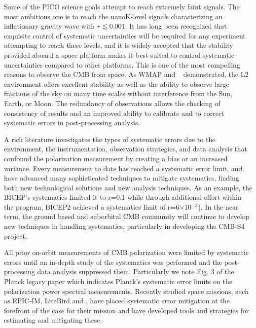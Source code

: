 \documentclass[PICOReport.tex]{subfiles}
\begin{document}
Some of the PICO science goals attempt to reach extremely faint signals. The most ambitious one is to reach the nanoK-level 
signals characterizing an inflationary gravity wave with $r\lesssim0.001$. 
It has long been recognized that exquisite control of systematic uncertainties will be required for any experiment attempting 
to reach these levels, and it is widely accepted that the stability provided aboard a space platform makes it best suited to
control systematic uncertainties compared to other platforms. This is one of the most compelling reasons to observe the 
CMB from space.  As WMAP and \planck~ demonstrated, the L2 environment offers excellent stability as well 
as the ability to observe large fractions of the sky on many time scales without interference from the Sun, Earth, or Moon.
The redundancy of observations allows the checking of consistency of results and an improved ability to calibrate and to correct systematic errors in post-processing analysis. 

A rich literature investigates the types of systematic errors due to the environment, the instrumentation, observation strategies, and data analysis that confound the polarization measurement by creating a bias or an increased variance\cite{hu03,shimon2008,yadav2010}. 
Every measurement to date has  reached a systematic error limit, and have advanced many sophisticated techniques to mitigate systematics, finding both new technological solutions and new analysis techniques.
As an example, the BICEP's systematics limited it to r=0.1\cite{Takahaski2010} while through additional effort within the program, BICEP2 achieved a systematics limit of r=6$\times$10$^{-3}$\cite{BICEP2_III}).
In the near term, the ground based and suborbital CMB community will continue to develop new techniques in handling systematics, particularly in developing the CMB-S4 project.

All prior on-orbit measurements of CMB polarization were limited by systematic errors until an in-depth study of the systematics was performed and the post-processing data analysis suppressed them\cite{Bennett13,planck2016_xlvi,Planck2018_I}. 
Particularly we note Fig. 3 of the Planck legacy paper which indicates Planck's systematic error limits on the polarization power spectral measurements.
Recently studied space missions, such as EPIC-IM, LiteBird and  \core, have placed
systematic error mitigation at the forefront of the case for their
mission and have developed tools and strategies for estimating and mitigating these\cite{hazumi2012,wallis2017,Natoli2018}.
\end{document}
